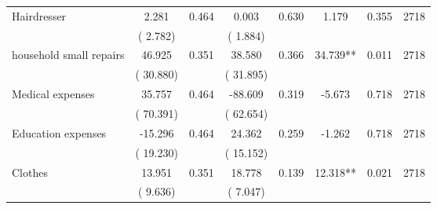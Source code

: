 \begin{tabular}{l*{7}{c}}
 Hairdresser       &              2.281       &        0.464  &              0.003       &        0.630  &              1.179       &              0.355 &  2718 \\ 
                       &       (       2.782)             &                               &       (       1.884)                     &                               &                                               &                                &                      \\ 

 household small repairs       &             46.925       &        0.351  &             38.580       &        0.366  &             34.739**       &              0.011 &  2718 \\ 
                       &       (      30.880)             &                               &       (      31.895)                     &                               &                                               &                                &                      \\ 

 Medical expenses       &             35.757       &        0.464  &            -88.609       &        0.319  &             -5.673       &              0.718 &  2718 \\ 
                       &       (      70.391)             &                               &       (      62.654)                     &                               &                                               &                                &                      \\ 

 Education expenses       &            -15.296       &        0.464  &             24.362       &        0.259  &             -1.262       &              0.718 &  2718 \\ 
                       &       (      19.230)             &                               &       (      15.152)                     &                               &                                               &                                &                      \\ 

 Clothes       &             13.951       &        0.351  &             18.778       &        0.139  &             12.318**       &              0.021 &  2718 \\ 
                       &       (       9.636)             &                               &       (       7.047)                     &                               &                                               &                                &                      \\ 


\end{tabular}
